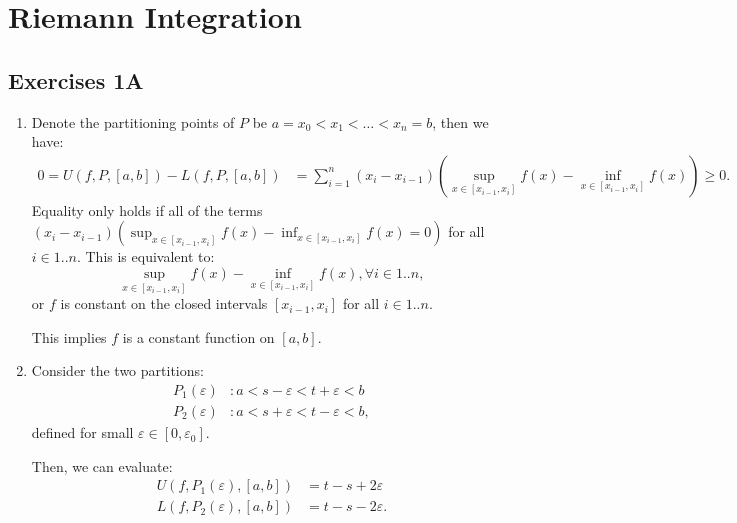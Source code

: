 \chapter{Riemann Integration}

\section{Exercises 1A} %
\label{sec:Exercises 1A}

\begin{enumerate}[label=\textbf{1A.\arabic*}]
  \item Denote the partitioning points of \( P \) be \( a = x_{0} < x_{1} <
    \ldots  < x_{n} = b \), then we have:
    \begin{align*}
      0 = U(f, P, [a, b]) - L(f, P, [a, b]) &= \sum_{i = 1}^{n} (x_{i} -
      x_{i-1})
      \left( \sup_{x \in [x_{i-1}, x_{i}]} f(x) - \inf_{x \in [x_{i-1}, x_{i}]}
      f(x) \right) \ge 0
    .\end{align*}
    Equality only holds if all of the terms \( (x_{i} -
      x_{i-1})
      \left( \sup_{x \in [x_{i-1}, x_{i}]} f(x) - \inf_{x \in [x_{i-1}, x_{i}]}
      f(x)  = 0\right) \) for all \( i \in 1..n \). This is equivalent to:
      \[
        \sup_{x \in [x_{i-1}, x_{i}]} f(x) - \inf_{x \in [x_{i-1}, x_{i}]} f(x),
        \forall  i \in 1..n
      ,\] or \( f \) is constant on the closed intervals \( [x_{i-1}, x_{i}] \)
      for all \( i \in 1..n \).

    This implies \( f \) is a constant function on \( [a, b] \).
  \item \label{1A2} Consider the two partitions:
    \begin{align*}
      P_{1}(\varepsilon)&: a < s - \varepsilon < t + \varepsilon < b\\
      P_{2}(\varepsilon)&: a < s + \varepsilon < t - \varepsilon < b
    ,\end{align*} defined for small \( \varepsilon \in [0, \varepsilon_{0}] \).

    Then, we can evaluate:
    \begin{align*}
      U(f, P_{1}(\varepsilon), [a, b]) &= t - s + 2\varepsilon \\
      L(f, P_{2}(\varepsilon), [a, b]) &= t - s - 2\varepsilon
    .\end{align*}


\end{enumerate}
